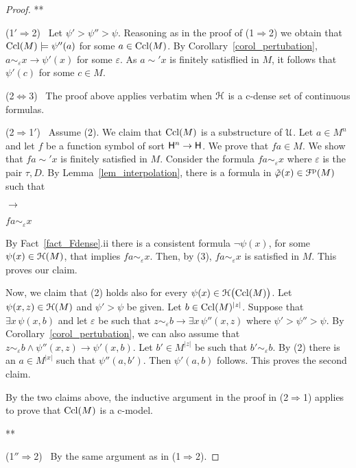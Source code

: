 \documentclass{amsproc}
\begin{document}
{\begin{proof}
\hfil***

  (1$'\!\Rightarrow$2) \ 
  Let $\psi'>\psi''>\psi$.
  Reasoning as in the proof of (1$\Rightarrow$2) we obtain that ${\rm Ccl}(M)\models\psi''(a)$ for some $a\in{\rm Ccl}(M)$.
  By Corollary~\ref{corol_pertubation}, $a\sim_\varepsilon x\rightarrow\psi'(x)$ for some $\varepsilon$.
  As $a\sim'x$ is finitely satisflied in $M$, it follows that $\psi'(c)$ for some $c\in M$.

  (2$\Leftrightarrow$3) \ 
  The proof above applies verbatim when ${\EuScript H}$ is a c-dense set of continuous formulas.
  
  (2$\Rightarrow$1$'$) \ 
  Assume (2).
  We claim that ${\rm Ccl}(M)$ is a substructure of ${\EuScript U}$.  
  Let $a\in M^{n}$ and let $f$ be a function symbol of sort ${\sf H}^{n}\to{\sf H}$.
  We prove that $fa\in M$.
  We show that $fa\sim' x$ is finitely satisfied in $M$.
  Consider the formula $fa\sim_\varepsilon  x$ where $\varepsilon$ is the pair $\tau,D$.
  By Lemma~\ref{lem_interpolation}, there is a formula in $\tilde\varphi(x)\in{\EuScript F}^{\rm p}(M)$ such that
  
  \ceq{\hfill fa\sim_\tau x}{\rightarrow}{\neg\tilde\varphi(x)}\parbox{6ex}{\hfil$\rightarrow$}$fa\sim_\varepsilon  x$

  By Fact~\ref{fact_Fdense}.ii there is a consistent formula  $\neg\psi(x)$, for some $\psi(x)\in{\EuScript H}(M)$, that implies $fa\sim_\varepsilon  x$.
  Then, by (3), $fa\sim_\varepsilon  x$ is satisfied in $M$.
  This proves our claim.

  Now, we claim that (2) holds also for every $\psi(x)\in{\EuScript H}\big({\rm Ccl}(M)\big)$.
  Let $\psi(x,z)\in{\EuScript H}(M)$ and $\psi'>\psi$ be given.
  Let $b\in{\rm Ccl}(M)^{|z|}$.
  Suppose that $\exists x\,\psi(x,b)$ and let $\varepsilon$ be such that $z\sim_\varepsilon b\rightarrow\exists x\,\psi''(x,z)$ where $\psi'>\psi''>\psi$.
  By Corollary~\ref{corol_pertubation}, we can also assume that $z\sim_\varepsilon b\wedge\psi''(x,z)\rightarrow\psi'(x,b)$. 
  Let $b'\in M^{|z|}$ be such that $b'\sim_\varepsilon b$.
  By (2) there is an $a\in M^{|x|}$ such that $\psi''(a,b')$.
  Then $\psi'(a,b)$ follows.
  This proves the second claim.

  By the two claims above, the inductive argument in the proof in (2$\Rightarrow$1) applies to prove that ${\rm Ccl}(M)$ is a c-model.

  \hfil***

  (1$''\!\Rightarrow$2) \ 
  By the same argument as in (1$\Rightarrow$2).



\end{proof}}
\end{document}
